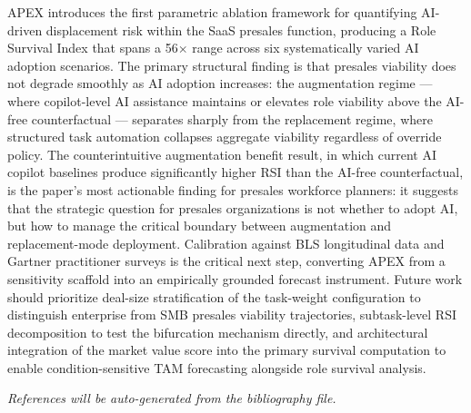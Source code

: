 \documentclass[10pt, conference]{IEEEtran}
\begin{document}
APEX introduces the first parametric ablation framework for quantifying AI-driven displacement risk within the SaaS presales function, producing a Role Survival Index that spans a 56$\times$ range across six systematically varied AI adoption scenarios. The primary structural finding is that presales viability does not degrade smoothly as AI adoption increases: the augmentation regime --- where copilot-level AI assistance maintains or elevates role viability above the AI-free counterfactual --- separates sharply from the replacement regime, where structured task automation collapses aggregate viability regardless of override policy. The counterintuitive augmentation benefit result, in which current AI copilot baselines produce significantly higher RSI than the AI-free counterfactual, is the paper's most actionable finding for presales workforce planners: it suggests that the strategic question for presales organizations is not whether to adopt AI, but how to manage the critical boundary between augmentation and replacement-mode deployment. Calibration against BLS longitudinal data and Gartner practitioner surveys is the critical next step, converting APEX from a sensitivity scaffold into an empirically grounded forecast instrument. Future work should prioritize deal-size stratification of the task-weight configuration to distinguish enterprise from SMB presales viability trajectories, subtask-level RSI decomposition to test the bifurcation mechanism directly, and architectural integration of the market value score into the primary survival computation to enable condition-sensitive TAM forecasting alongside role survival analysis.

\textit{References will be auto-generated from the bibliography file.}



\end{document}
